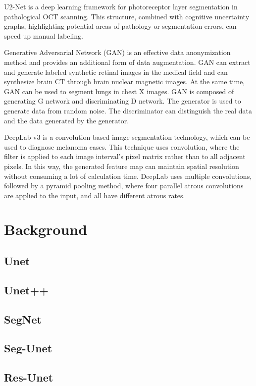 \documentclass{article}
\begin{document}
U2-Net is a deep learning framework for photoreceptor layer segmentation in pathological OCT scanning.
This structure, combined with cognitive uncertainty graphs, highlighting potential areas of pathology or segmentation errors, can speed up manual labeling.\cite{orlando2019u2}

Generative Adversarial Network (GAN) is an effective data anonymization method and provides an additional form of data augmentation.
GAN can extract and generate labeled synthetic retinal images in the medical field and can synthesize brain CT through brain nuclear magnetic images.\cite{shin2018medical}
At the same time, GAN can be used to segment lungs in chest X images.
GAN is composed of generating G network and discriminating D network.
The generator is used to generate data from random noise.
The discriminator can distinguish the real data and the data generated by the generator.\cite{munawar2020segmentation}

DeepLab v3 is a convolution-based image segmentation technology, which can be used to diagnose melanoma cases.
This technique uses convolution, where the filter is applied to each image interval's pixel matrix rather than to all adjacent pixels.
In this way, the generated feature map can maintain spatial resolution without consuming a lot of calculation time.
DeepLab uses multiple convolutions, followed by a pyramid pooling method, where four parallel atrous convolutions are applied to the input, and all have different atrous rates.\cite{wang2018skin}
\section{Background}

\subsection{Unet}
\subsection{Unet++}
\subsection{SegNet}
\subsection{Seg-Unet}
\subsection{Res-Unet}
\end{document}
